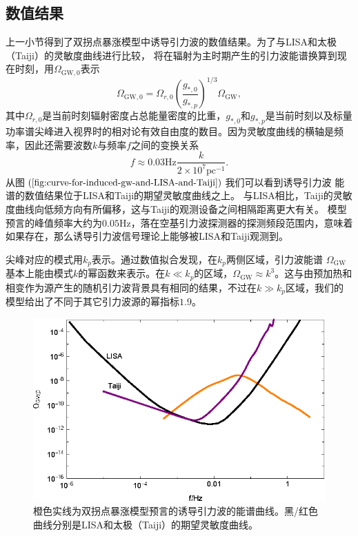\subsection{数值结果}
上一小节得到了双拐点暴涨模型中诱导引力波的数值结果。为了与LISA\citep{amaro2017laser}和太极（Taiji）\citep{guo2018taiji}的灵敏度曲线进行比较，
将在辐射为主时期产生的引力波能谱换算到现在时刻，用$\Omega_{\text{GW},0}$表示
\begin{equation}
  \label{eq:energy-spectrum-of-GW-at-now}
  \Omega_{\text{GW},0} =
  \Omega_{r,0}{\left(\frac{g_{*,0}}{g_{*,p}}\right)}^{1
  /3}\Omega_{\text{GW}},
\end{equation}
其中$\Omega_{r,0}$是当前时刻辐射密度占总能量密度的比重，$g_{*,0}$和$g_{*,p}$是当前时刻以及标量功率谱尖峰进入视界时的相对论有效自由度的数目。因为灵敏度曲线的横轴是频率，因此还需要波数$k$与频率$f$之间的变换关系
\begin{equation}
  \label{eq:frequency-from-wave-numbers}
  f \approx 0.03\mathrm{Hz} \frac{k}{2\times 10^{7}\text{pc}^{-1}}.
\end{equation}
从图$(\ref{fig:curve-for-induced-gw-and-LISA-and-Taiji})$我们可以看到诱导引力波
能谱的数值结果位于LISA\citep{amaro2017laser}和Taiji\citep{guo2018taiji}的期望灵敏度曲线之上。
与LISA相比，Taiji的灵敏度曲线向低频方向有所偏移，这与Taiji的观测设备之间相隔距离更大有关。
模型预言的峰值频率大约为$0.05\text{Hz}$，落在空基引力波探测器的探测频段范围内，意味着如果存在，那么诱导引力波信号理论上能够被LISA和Taiji观测到。

尖峰对应的模式用$k_{p}$表示。通过数值拟合发现，在$k_{p}$两侧区域，引力波能谱
$\Omega_{\text{GW}}$基本上能由模式$k$的幂函数来表示。在$k\ll
k_{p}$的区域，$\Omega_{\text{GW}}\approx
k^3$。这与由预加热和相变作为源产生的随机引力波背景具有相同的结果，不过在$k\gg
k_{p}$区域，我们的模型给出了不同于其它引力波源的幂指标$1.9$。

\begin{figure}[!htbp]
  \centering
  \includegraphics[width=6in]{Img/Lisa2.eps}
  \caption{橙色实线为双拐点暴涨模型预言的诱导引力波的能谱曲线。黑/红色曲线分别是LISA\citep{amaro2017laser}和太极（Taiji）\citep{guo2018taiji}的期望灵敏度曲线。}\label{fig:curve-for-induced-gw-and-LISA-and-Taiji}
\end{figure}

